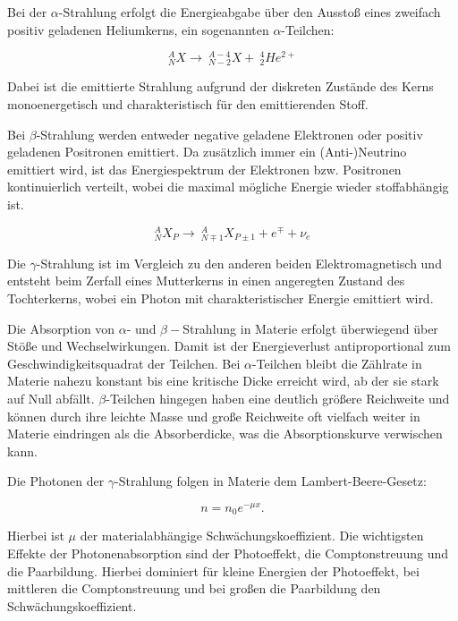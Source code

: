\documentclass{article}
\begin{document}
Bei der $\alpha$-Strahlung erfolgt die Energieabgabe über den Ausstoß eines zweifach positiv geladenen Heliumkerns, ein sogenannten $\alpha$-Teilchen:

\begin{equation}
    ^A_NX \rightarrow \ ^{A-4}_{N-2}X + \ ^4_2He^{2+}
\end{equation}

Dabei ist die emittierte Strahlung aufgrund der diskreten Zustände des Kerns monoenergetisch und charakteristisch für den emittierenden Stoff. 

Bei $\beta$-Strahlung werden entweder negative geladene Elektronen oder positiv geladenen Positronen emittiert. Da zusätzlich immer ein (Anti-)Neutrino emittiert wird, ist das Energiespektrum der Elektronen bzw. Positronen kontinuierlich verteilt, wobei die maximal mögliche Energie wieder stoffabhängig ist.

\begin{equation}
    ^A_NX_P \rightarrow \ ^{A}_{N\mp1}X_{P\pm1} + e^{\mp} + \nu_e
\end{equation}


Die $\gamma$-Strahlung ist im Vergleich zu den anderen beiden Elektromagnetisch und entsteht beim Zerfall eines Mutterkerns in einen angeregten Zustand des Tochterkerns, wobei ein Photon mit charakteristischer Energie emittiert wird. 

Die Absorption von $\alpha$- und $\beta-$Strahlung in Materie erfolgt überwiegend über Stöße und Wechselwirkungen. Damit ist der Energieverlust antiproportional zum Geschwindigkeitsquadrat der Teilchen. Bei $\alpha$-Teilchen bleibt die Zählrate in Materie nahezu konstant bis eine kritische Dicke erreicht wird, ab der sie stark auf Null abfällt. $\beta$-Teilchen hingegen haben eine deutlich größere Reichweite und können durch ihre leichte Masse und große Reichweite oft vielfach weiter in Materie eindringen als die Absorberdicke, was die Absorptionskurve verwischen kann.

Die Photonen der $\gamma$-Strahlung folgen in Materie dem Lambert-Beere-Gesetz:

\begin{equation}
    n = n_0 e^{- \mu x}.
    \label{eq:Lambert-Beere}
\end{equation}

Hierbei ist $\mu$ der materialabhängige Schwächungskoeffizient. Die wichtigsten Effekte der Photonenabsorption sind der Photoeffekt, die Comptonstreuung und die Paarbildung. Hierbei dominiert für kleine Energien der Photoeffekt, bei mittleren die Comptonstreuung und bei großen die Paarbildung den Schwächungskoeffizient. 
\end{document}

